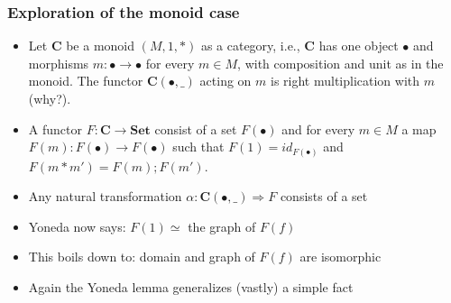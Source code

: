 \documentclass[handout]{beamer}
\newcommand{\To}{\Rightarrow}
\newcommand{\bfsf}[1]{{\boldsymbol{#1}}}
\newcommand{\Set}{\bfsf{Set}}
\newcommand{\CC}{\bfsf{C}}
\begin{document}
\frame
  {   
    \frametitle{Exploration of the monoid case}\label{Yon:Mon}

 \begin{itemize}[<+->]
\item Let $\CC$ be a monoid $(M,1,*)$ as a category, i.e., $\CC$ has one object
$\bullet$ and morphisms $m:\bullet\to\bullet$ for 
every $m\in M$, with composition and unit as in the monoid.
The functor $\CC(\bullet,\_)$ acting on $m$ is right multiplication with $m$ (why?).
\item A functor $F:\CC\to\Set$ consist of a set $F(\bullet)$ and for every
$m\in M$ a map $F(m) : F(\bullet)\to F(\bullet)$ such that $F(1)= id_{F(\bullet)}$
and $F(m*m')=F(m);F(m')$.
\item Any natural transformation $\alpha: \CC(\bullet,\_)\To F$ consists of
a set 

\item Yoneda now says:   $F(1) \simeq{}$ the graph of $F(f)$
\item This boils down to: domain and graph of $F(f)$ are isomorphic
\item Again  the Yoneda lemma generalizes (vastly) a simple fact
 \end{itemize}

 }
\end{document}
